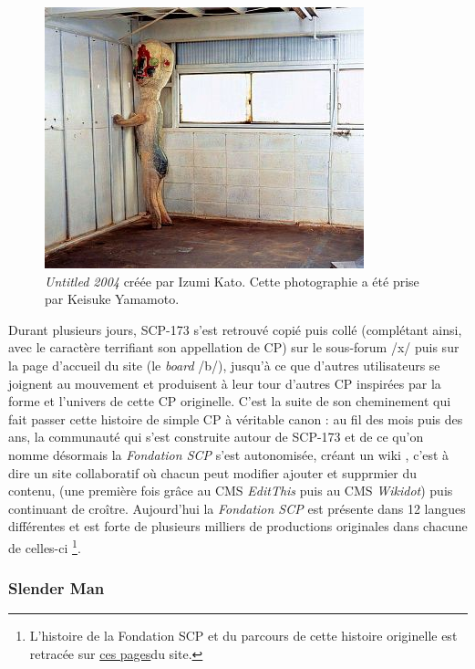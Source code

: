\documentclass[12pt,a4paper,oneside,titlepage]{book} %
\begin{document}
		\begin{figure}
		\centering
		\includegraphics[scale=0.5]{illustration/SCP_173.jpg}
		
		\caption{\small \emph{Untitled 2004} créée par Izumi Kato. Cette photographie a été prise par Keisuke Yamamoto.}
		\label{img:scp_173}
	\end{figure}
	
	Durant plusieurs jours, SCP-173 s'est retrouvé copié puis collé (complétant ainsi, avec le caractère terrifiant son appellation de CP) sur le sous-forum /x/ puis sur la page d'accueil du site (le \textit{board} /b/), jusqu'à ce que d'autres utilisateurs se joignent au mouvement et produisent à leur tour d'autres CP inspirées par la forme et l'univers de cette CP originelle.
	C'est la suite de son cheminement qui fait passer cette histoire de simple CP à véritable canon : au fil des mois puis des ans, la communauté qui s'est construite autour de SCP-173 et de ce qu'on nomme désormais la \emph{Fondation SCP} s'est autonomisée, créant un wiki , c'est à dire un site collaboratif où chacun peut modifier ajouter et supprmier du contenu, (une première fois grâce au CMS \emph{EditThis} puis au CMS \emph{Wikidot}) puis continuant de croître. Aujourd’hui la \emph{Fondation SCP} est présente dans 12 langues différentes et est forte de plusieurs milliers de productions originales dans chacune de celles-ci \footnote{L'histoire de la Fondation SCP et du parcours de cette histoire originelle est retracée sur \href{http://fondationscp.wikidot.com/history-of-the-universe-part-one}{ces pages}du site.}.

\subsubsection{Slender Man}
\end{document}
